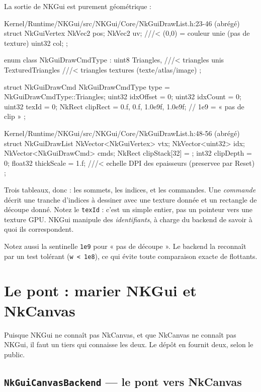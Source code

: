 La sortie de NKGui est purement géométrique :

\begin{nkcode}{Kernel/Runtime/NKGui/src/NKGui/Core/NkGuiDrawList.h:23-46 (abrégé)}
struct NkGuiVertex {
        NkVec2 pos;
        NkVec2 uv;   ///< (0,0) = couleur unie (pas de texture)
        uint32 col;
};

enum class NkGuiDrawCmdType : uint8 {
    Triangles,         ///< triangles unis
    TexturedTriangles  ///< triangles textures (texte/atlas/image)
};

struct NkGuiDrawCmd {
        NkGuiDrawCmdType type = NkGuiDrawCmdType::Triangles;
        uint32 idxOffset = 0;
        uint32 idxCount  = 0;
        uint32 texId     = 0;
        NkRect clipRect  = {0.f, 0.f, 1.0e9f, 1.0e9f};   // 1e9 = « pas de clip »
};
\end{nkcode}

\begin{nkcode}{Kernel/Runtime/NKGui/src/NKGui/Core/NkGuiDrawList.h:48-56 (abrégé)}
struct NkGuiDrawList {
        NkVector<NkGuiVertex> vtx;
        NkVector<uint32>      idx;
        NkVector<NkGuiDrawCmd> cmds;
        NkRect  clipStack[32] = {};
        int32   clipDepth = 0;
        float32 thickScale = 1.f; ///< echelle DPI des epaisseurs (preservee par Reset)
};
\end{nkcode}

Trois tableaux, donc : les sommets, les indices, et les commandes. Une
\emph{commande} décrit une tranche d'indices à dessiner avec une texture donnée
et un rectangle de découpe donné. Notez le \texttt{texId} : c'est un simple
entier, pas un pointeur vers une texture GPU. NKGui manipule des
\emph{identifiants}, à charge du backend de savoir à quoi ils correspondent.

Notez aussi la sentinelle \texttt{1e9} pour « pas de découpe ». Le backend la
reconnaît par un test tolérant (\texttt{w < 1e8}), ce qui évite toute
comparaison exacte de flottants.

\section{Le pont : marier NKGui et NkCanvas}

Puisque NKGui ne connaît pas NkCanvas, et que NkCanvas ne connaît pas NKGui, il
faut un tiers qui connaisse les deux. Le dépôt en fournit deux, selon le public.

\subsection{\texttt{NkGuiCanvasBackend} — le pont vers NkCanvas}

